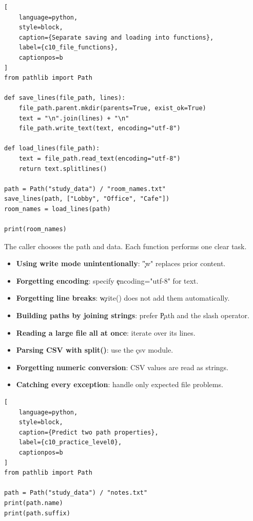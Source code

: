 \begin{lstlisting}[
    language=python,
    style=block,
    caption={Separate saving and loading into functions},
    label={c10_file_functions},
    captionpos=b
]
from pathlib import Path

def save_lines(file_path, lines):
    file_path.parent.mkdir(parents=True, exist_ok=True)
    text = "\n".join(lines) + "\n"
    file_path.write_text(text, encoding="utf-8")

def load_lines(file_path):
    text = file_path.read_text(encoding="utf-8")
    return text.splitlines()

path = Path("study_data") / "room_names.txt"
save_lines(path, ["Lobby", "Office", "Cafe"])
room_names = load_lines(path)

print(room_names)
\end{lstlisting}

The caller chooses the path and data. Each function performs one clear task.


\begin{itemize}
    \item \textbf{Using write mode unintentionally}: \c{"w"} replaces prior content.
    \item \textbf{Forgetting encoding}: specify \c{encoding="utf-8"} for text.
    \item \textbf{Forgetting line breaks}: \c{write()} does not add them automatically.
    \item \textbf{Building paths by joining strings}: prefer \c{Path} and the slash operator.
    \item \textbf{Reading a large file all at once}: iterate over its lines.
    \item \textbf{Parsing CSV with split()}: use the \c{csv} module.
    \item \textbf{Forgetting numeric conversion}: CSV values are read as strings.
    \item \textbf{Catching every exception}: handle only expected file problems.
\end{itemize}



\begin{lstlisting}[
    language=python,
    style=block,
    caption={Predict two path properties},
    label={c10_practice_level0},
    captionpos=b
]
from pathlib import Path

path = Path("study_data") / "notes.txt"
print(path.name)
print(path.suffix)
\end{lstlisting}

